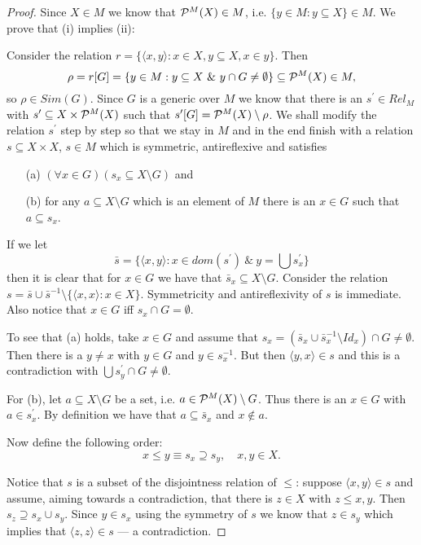 \begin{proof}
Since $X\in M$ we know that ${{\mathcal P}}^M(X)\in M$, i.e. $\{y\in M:y\subseteq X\}\in M$. We prove that (i) implies (ii):

Consider the relation $r=\{\langle x,y\rangle:x\in X,y\subseteq X, x\in y\}$. Then
$$ %
\rho=r[G]=\{y\in M:y\subseteq X\ \&\ y\cap G\neq\emptyset\}\subseteq\pw^M(X)\in M,
$$ %
so $\rho\in Sim(G)$. Since $G$ is a generic over $M$ we know that there is an $s^\prime\in Rel_M$ with $s^\prime\subseteq X\times{{\mathcal P}}^M(X)$ such that
$s^\prime[G]={{\mathcal P}}^M(X)\setminus\rho$. We shall modify the relation $s^\prime$ step by step so that we stay in $M$ and in the end finish with a relation
$s\subseteq X\times X$, $s\in M$ which is symmetric, antireflexive and satisfies
\begin{itemize}
\item[(a)] $(\forall x\in G)(s_x\subseteq X\setminus G)$ and
\item[(b)] for any $a\subseteq X\setminus G$ which is an element of $M$ there is an $x\in G$ such that $a\subseteq s_x$.
\end{itemize}
If we let
$$ %
\bar{s}=\{\langle x,y\rangle:x\in dom(s^\prime)\ \&\ y=\bigcup s^\prime_x\}
$$ %
then it is clear that for $x\in G$ we have that $\bar{s}_x\subseteq X\setminus G$. Consider the relation $s=\bar{s}\cup\bar{s}^{-1}\setminus\{\langle x,x\rangle:x\in X\}$.
Symmetricity and antireflexivity of $s$ is immediate. Also notice that $x\in G$ iff $s_x\cap G=\emptyset$.

To see that (a) holds, take $x\in G$ and assume that $s_x=(\bar{s}_x\cup\bar{s}^{-1}_x\setminus Id_x)\cap G\neq\emptyset$. Then there is a $y\neq x$ with $y\in G$ and $y\in s^{-1}_x$. But then $\langle y,x\rangle\in s$ and this is a contradiction with $\bigcup s^\prime_y \cap G\neq\emptyset$.

For (b), let $a\subseteq X\setminus G$ be a set, i.e. $a\in{{\mathcal P}}^M(X)\setminus G$. Thus there is an $x\in G$ with $a\in s^\prime_x$. By definition we have that
$a\subseteq \bar{s}_x$ and $x\not\in a$.

Now define the following order:
$$ %
x\leq y\equiv s_x\supseteq s_y,\quad x,y\in X.
$$ %

Notice that $s$ is a subset of the disjointness relation of $\leq$: suppose $\langle x,y\rangle\in s$ and assume, aiming towards a contradiction, that there is $z\in X$ with $z\leq x,y$. Then $s_z\supseteq s_x\cup s_y$. Since $y\in s_x$ using the symmetry of $s$ we know that $z\in s_y$ which implies that $\langle z,z\rangle\in s$ --- a contradiction.


\end{proof}
